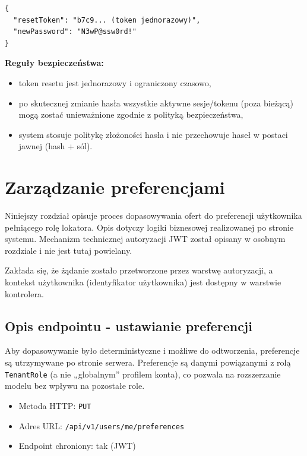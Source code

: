 \documentclass[11pt, a4paper]{article}
\begin{document}
\begin{lstlisting}[style=json,caption={Ciało żądania — potwierdzenie resetu hasła}]
{
  "resetToken": "b7c9... (token jednorazowy)",
  "newPassword": "N3wP@ssw0rd!"
}
\end{lstlisting}

\noindent\textbf{Reguły bezpieczeństwa:}
\begin{itemize}
    \item token resetu jest jednorazowy i ograniczony czasowo,
    \item po skutecznej zmianie hasła wszystkie aktywne sesje/tokenu (poza bieżącą) mogą zostać unieważnione zgodnie z polityką bezpieczeństwa,
    \item system stosuje politykę złożoności hasła i nie przechowuje haseł w postaci jawnej (hash + sól).
\end{itemize}

\section{Zarządzanie preferencjami}

Niniejszy rozdział opisuje proces dopasowywania ofert do preferencji użytkownika
pełniącego rolę lokatora. Opis dotyczy logiki biznesowej realizowanej po stronie
systemu. Mechanizm technicznej autoryzacji JWT został opisany w osobnym rozdziale
i nie jest tutaj powielany.

Zakłada się, że żądanie zostało przetworzone przez warstwę autoryzacji, a
kontekst użytkownika (identyfikator użytkownika) jest dostępny w warstwie
kontrolera.

\subsection{Opis endpointu - ustawianie preferencji}
Aby dopasowywanie było deterministyczne i możliwe do odtworzenia, preferencje są utrzymywane po stronie serwera.
Preferencje są danymi powiązanymi z rolą \texttt{TenantRole} (a nie „globalnym” profilem konta), co pozwala na rozszerzanie modelu
bez wpływu na pozostałe role.

\begin{itemize}
    \item Metoda HTTP: \texttt{PUT}
    \item Adres URL: \texttt{/api/v1/users/me/preferences}
    \item Endpoint chroniony: tak (JWT)
\end{itemize}
\end{document}
